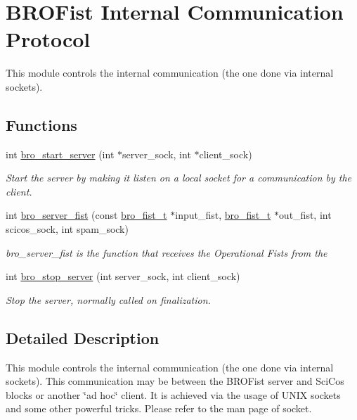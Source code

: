 \hypertarget{group___bro_comm}{
\section{BROFist Internal Communication Protocol}
\label{group___bro_comm}
}


This module controls the internal communication (the one done via internal sockets).  


\subsection*{Functions}
\begin{DoxyCompactItemize}
\item 
int \hyperlink{group___bro_comm_ga7fa314c91710130869c2d4ba31f4ac77}{bro\_\-start\_\-server} (int $\ast$server\_\-sock, int $\ast$client\_\-sock)
\begin{DoxyCompactList}\small\item\em Start the server by making it listen on a local socket for a communication by the client. \item\end{DoxyCompactList}\item 
int \hyperlink{group___bro_comm_ga2f7cfb1ee0291e76edde0288f71dc02c}{bro\_\-server\_\-fist} (const \hyperlink{structbro__fist__t}{bro\_\-fist\_\-t} $\ast$input\_\-fist, \hyperlink{structbro__fist__t}{bro\_\-fist\_\-t} $\ast$out\_\-fist, int scicos\_\-sock, int spam\_\-sock)
\begin{DoxyCompactList}\small\item\em bro\_\-server\_\-fist is the function that receives the Operational Fists from the \item\end{DoxyCompactList}\item 
int \hyperlink{group___bro_comm_ga1686032e099ddba351e93ec6ec6f6b4f}{bro\_\-stop\_\-server} (int server\_\-sock, int client\_\-sock)
\begin{DoxyCompactList}\small\item\em Stop the server, normally called on finalization. \item\end{DoxyCompactList}\end{DoxyCompactItemize}


\subsection{Detailed Description}
This module controls the internal communication (the one done via internal sockets). This communication may be between the BROFist server and SciCos blocks or another \char`\"{}ad hoc\char`\"{} client. It is achieved via the usage of UNIX sockets and some other powerful tricks. Please refer to the man page of {\ttfamily socket}. 

